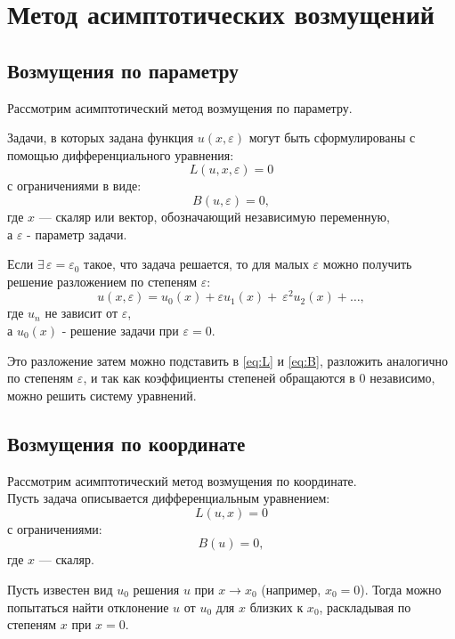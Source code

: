 \chapter*{Метод асимптотических возмущений}

\section*{Возмущения по параметру}
Рассмотрим асимптотический метод возмущения по параметру.

Задачи, в которых задана функция $u(x, \varepsilon)$
могут быть сформулированы с помощью
дифференциального уравнения:
\begin{equation}
    \label{eq:L}
    L(u, x, \varepsilon) = 0
\end{equation}
с ограничениями в виде:
\begin{equation}
    \label{eq:B}
    B(u, \varepsilon) = 0,
\end{equation}
где $x$ --- скаляр или вектор, обозначающий независимую переменную,\\
а $\varepsilon$ - параметр задачи.

Если $\exists \, \varepsilon = \varepsilon_0$
такое, что задача решается, то для малых $\varepsilon$
можно получить решение разложением по степеням $\varepsilon$:
\begin{equation*}
   u(x, \varepsilon) = u_0(x) + \varepsilon u_1(x) + \
   \varepsilon^2 u_2(x) + \dots,
\end{equation*}
где $u_n$ не зависит от $\varepsilon$,\\
а $u_0(x)$ - решение задачи при $\varepsilon = 0$.

Это разложение затем можно подставить
в \eqref{eq:L} и \eqref{eq:B},
разложить аналогично по степеням $\varepsilon$,
и так как коэффициенты степеней обращаются в 0 независимо,
можно решить систему уравнений.

\clearpage
\section*{Возмущения по координате}

Рассмотрим асимптотический метод возмущения по координате.\\
Пусть задача описывается дифференциальным уравнением:
\begin{equation*}
    L(u, x) = 0
\end{equation*}
с ограничениями:
\begin{equation*}
    B(u) = 0,
\end{equation*}
где $x$ --- скаляр.

Пусть известен вид $u_0$ решения $u$
при $x \to x_0$ (например, $x_0 = 0$).
Тогда можно попытаться найти отклонение $u$ от $u_0$
для $x$ близких к $x_0$,
раскладывая по степеням $x$ при $x = 0$.


